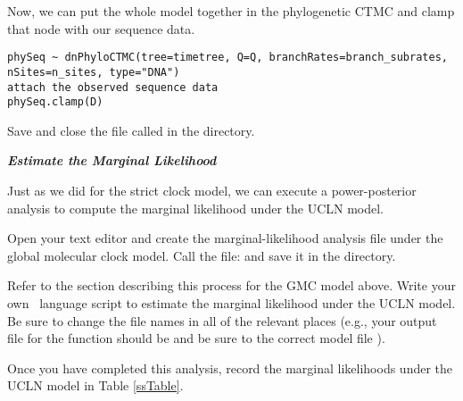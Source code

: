 Now, we can put the whole model together in the phylogenetic CTMC and clamp that node with our sequence data.
{\tt \begin{snugshade*}
\begin{lstlisting}
phySeq ~ dnPhyloCTMC(tree=timetree, Q=Q, branchRates=branch_subrates, nSites=n_sites, type="DNA")
attach the observed sequence data
phySeq.clamp(D)
\end{lstlisting}
\end{snugshade*}}

{\begin{framed}
Save and close the file called {\textcolor{red}{}} in the  directory.
\end{framed}}



\textbf{\textit{Estimate the Marginal Likelihood}}

Just as we did for the strict clock model, we can execute a power-posterior analysis to compute the marginal likelihood under the UCLN model. 

{\begin{framed}
Open your text editor and create the marginal-likelihood analysis file under the global molecular clock model. Call the file: {\textcolor{red}{}} and save it in the  directory.
\end{framed}}

Refer to the section describing this process for the GMC model above.
Write your own \Rev~language script to estimate the marginal likelihood under the UCLN model. 
Be sure to change the file names in all of the relevant places (e.g., your output file for the  function should be \colorbox{shadecolor}{} and be sure to  the correct model file \colorbox{shadecolor}{}).

{\begin{framed}
Once you have completed this analysis, record the marginal likelihoods under the UCLN model in Table \ref{ssTable}.
\end{framed}}

